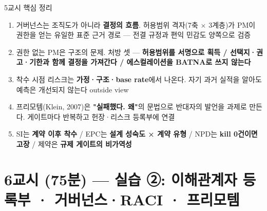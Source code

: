 \begin{frame}{5교시 핵심 정리}
\begin{enumerate}
\item 거버넌스는 조직도가 아니라 \textbf{결정의 흐름}. 허용범위 격자(7축 × 3계층)가 PM이 권한을 얻는 유일한 표준 근거 경로 — 전결 규정과 편익 민감도 양쪽으로 검증
\item 권한 없는 PM은 구조의 문제. 처방 셋 — \textbf{허용범위를 서명으로 획득 / 선택지·권고·기한과 함께 결정을 가져간다 / 에스컬레이션을 BATNA로 쓰지 않는다}
\item 착수 시점 리스크는 \textbf{가정·구조·base rate}에서 나온다. 자기 과거 실적을 알아도 예측은 개선되지 않는다 \ra{} outside view
\item 프리모템(Klein, 2007)은 \textbf{"실패했다. 왜"}의 문법으로 반대자의 발언을 과제로 만든다. 게이트마다 반복하고 헌장·리스크 등록부에 연결
\item SI는 \textbf{계약 이후 착수} / EPC는 \textbf{설계 성숙도 × 계약 유형} / NPD는 \textbf{kill 0건이면 고장} / 제약은 \textbf{규제 게이트의 비가역성}
\end{enumerate}
\end{frame}

\section{6교시 (75분) — 실습 ②: 이해관계자 등록부 · 거버넌스·RACI · 프리모템}

